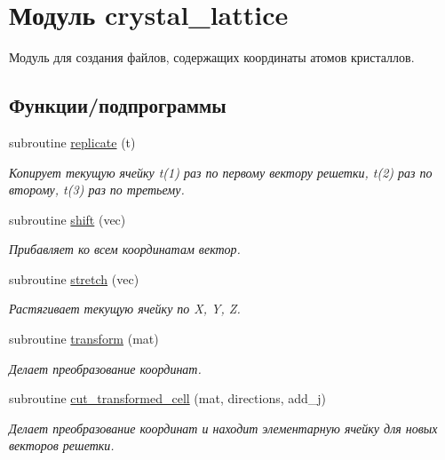 \hypertarget{namespacecrystal__lattice}{}\section{Модуль crystal\+\_\+lattice}
\label{namespacecrystal__lattice}


Модуль для создания файлов, содержащих координаты атомов кристаллов.  


\subsection*{Функции/подпрограммы}
\begin{DoxyCompactItemize}
\item 
subroutine \mbox{\hyperlink{namespacecrystal__lattice_ae3ea349cd216cd0f31efdd2d84704007}{replicate}} (t)
\begin{DoxyCompactList}\small\item\em Копирует текущую ячейку t(1) раз по первому вектору решетки, t(2) раз по второму, t(3) раз по третьему. \end{DoxyCompactList}\item 
subroutine \mbox{\hyperlink{namespacecrystal__lattice_a1591b9c034e98c3a8969210257581db5}{shift}} (vec)
\begin{DoxyCompactList}\small\item\em Прибавляет ко всем координатам вектор. \end{DoxyCompactList}\item 
subroutine \mbox{\hyperlink{namespacecrystal__lattice_ad78cba30d21fa9e157b11564b881f8cd}{stretch}} (vec)
\begin{DoxyCompactList}\small\item\em Растягивает текущую ячейку по X, Y, Z. \end{DoxyCompactList}\item 
subroutine \mbox{\hyperlink{namespacecrystal__lattice_a77b85f0b416c4a11dced3be62042df24}{transform}} (mat)
\begin{DoxyCompactList}\small\item\em Делает преобразование координат. \end{DoxyCompactList}\item 
subroutine \mbox{\hyperlink{namespacecrystal__lattice_a4521a112e9b35e44f528934fe2a532f1}{cut\+\_\+transformed\+\_\+cell}} (mat, directions, add\+\_\+j)
\begin{DoxyCompactList}\small\item\em Делает преобразование координат и находит элементарную ячейку для новых векторов решетки. \end{DoxyCompactList}\item 

\end{DoxyCompactItemize}
